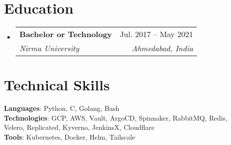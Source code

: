 \documentclass[letterpaper,11pt]{article}
\makeatletter
\newcommand{\resumeSubheading}[4]{
  \vspace{-2pt}\item
    \begin{tabular*}{0.97\textwidth}[t]{l@{\extracolsep{\fill}}r}
      \textbf{#1} & #2 \\
      \textit{\small#3} & \textit{\small #4} \\
    \end{tabular*}\vspace{-7pt}
}
\newcommand{\resumeSubHeadingListStart}{\begin{itemize}[leftmargin=0.15in, label={}]}
\newcommand{\resumeSubHeadingListEnd}{\end{itemize}}
\makeatother
\begin{document}
\section{Education}
  \resumeSubHeadingListStart
    \resumeSubheading
      {Bachelor or Technology}{Jul. 2017 -- May 2021}
      {Nirma University}{Ahmedabad, India}
  \resumeSubHeadingListEnd


\section{Technical Skills}
 \begin{itemize}[leftmargin=0.15in, label={}]
    \small{\item{
     \textbf{Languages}{: Python, C, Golang, Bash} \\
     \textbf{Technologies}{: GCP, AWS, Vault, ArgoCD, Spinnaker, RabbitMQ, Redis, Velero, Replicated, Kyverno, JenkinsX, Cloudflare} \\
     \textbf{Tools}{: Kubernetes, Docker, Helm, Tailscale} \\
    }}
 \end{itemize}


\end{document}
